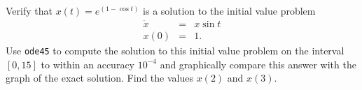 \documentclass{ximera}
\begin{document}
\begin{exercise}  \label{c11.3.2B}
Verify that $x(t) = e^{(1-\cos t)}$ is a solution to the initial value problem
\[
\begin{array}{rcl}
\dot{x} & = & x\sin t \\
x(0) & = & 1.
\end{array}
\]
Use {\tt ode45} to compute the solution to this initial value problem on the
interval $[0,15]$ to within an accuracy $10^{-4}$ and graphically compare 
this answer with the graph of the exact solution.  Find the values $x(2)$ 
and $x(3)$. 
\end{exercise}
\end{document}
